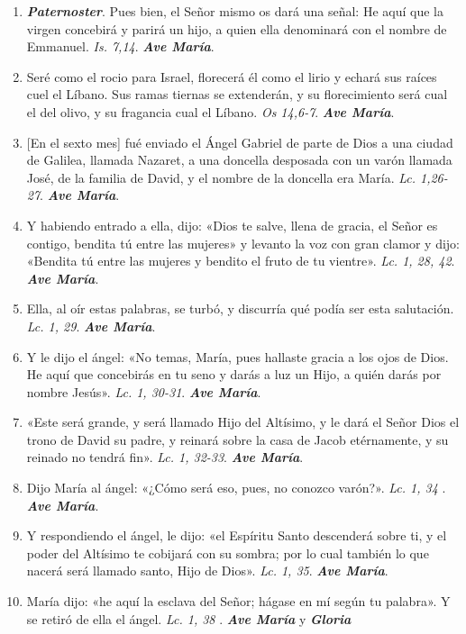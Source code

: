 \documentclass[../../devocionario.tex]{subfiles}
\begin{document}
    \begin{enumerate}
    
        \item \textbf{\textit{Paternoster}}. Pues bien, el Señor mismo os dará una señal: He aquí que la virgen concebirá y parirá un hijo, 
                a quien ella denominará con el nombre de Emmanuel. \textit{Is. 7,14}. \textbf{\textit{Ave María}}.

        \item Seré como el rocio para Israel, florecerá él como el lirio y echará sus raíces cuel el Líbano. 
                Sus ramas tiernas se extenderán, y su florecimiento será cual el del olivo, y su fragancia cual el Líbano. \textit{Os 14,6-7}. \textbf{\textit{Ave María}}.

        \item {[En el sexto mes]} fué enviado el Ángel Gabriel de parte de Dios a una ciudad de Galilea, llamada Nazaret, 
                a una doncella desposada con un varón llamada José, de la familia de David, y el nombre de la doncella era María. \textit{Lc. 1,26- 27}. \textbf{\textit{Ave María}}.

        \item Y habiendo entrado a ella, dijo: «Dios te salve, llena de gracia, el Señor es contigo, bendita tú entre las mujeres» y 
                levanto la voz con gran clamor y dijo: «Bendita tú entre las mujeres y bendito el fruto de tu vientre». \textit{Lc. 1, 28, 42}. \textbf{\textit{Ave María}}.

        \item Ella, al oír estas palabras, se turbó, y discurría qué podía ser esta salutación. \textit{Lc. 1, 29}. \textbf{\textit{Ave María}}.

        \item Y le dijo el ángel: «No temas, María, pues hallaste gracia a los ojos de Dios. He aquí que concebirás en tu seno y darás a luz un Hijo, 
                a quién darás por nombre Jesús». \textit{Lc. 1, 30-31}. \textbf{\textit{Ave María}}.

        \item «Este será grande, y será llamado Hijo del Altísimo, y le dará el Señor Dios el trono de David su padre, 
                y reinará sobre la casa de Jacob etérnamente, y su reinado no tendrá fin». \textit{Lc. 1, 32-33}. \textbf{\textit{Ave María}}.

        \item Dijo María al ángel: «¿Cómo será eso, pues, no conozco varón?». \textit{Lc. 1, 34} . \textbf{\textit{Ave María}}.

        \item Y respondiendo el ángel, le dijo: «el Espíritu Santo descenderá sobre ti, y el poder del Altísimo te cobijará con su sombra; 
                por lo cual también lo que nacerá será llamado santo, Hijo de Dios». \textit{Lc. 1, 35}. \textbf{\textit{Ave María}}.

        \item María dijo: «he aquí la esclava del Señor; hágase en mí según tu palabra». Y se retiró de ella el ángel. \textit{Lc. 1, 38} 
               . \textbf{\textit{Ave María}} y \textbf{\textit{Gloria}}

    \end{enumerate}
\end{document}
